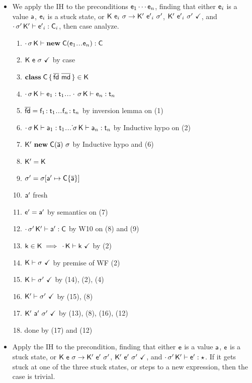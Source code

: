 \documentclass[acmlarge, anonymous, authordraft]{acmart}
\begin{document}
\begin{itemize}
  \item {}
  
  We apply the IH to the preconditions ${\sf{e}}_{1} \cdots {\sf{e}}_{n}$, finding that either ${\sf{e}}_{i}$ is a value ${\sf{a}}$, ${\sf{e}}_{i}$ is a stuck state, 
  or ${{\sf{K}}}~{{\sf{e}}_i}~{\sigma} \rightarrow {{\ensuremath{{\sf{K'}}}}}~{{{{\sf{e'}}}}_i}~{{{\sigma'}}}$, ${{\sf{K'}}}~{{{\sf{e'}}}}_i~{{\sigma'}}~\checkmark$, and $\cdot\,{{\sigma'}}\,{{\sf{K'}}}\vdash {{\ensuremath{{\sf{e'}}}}}_i : {\sf{C}}_i$, then case analyze.
    
  \begin{enumerate}
   \item $\EnvType\cdot\s\K{\New\C{\e_1\dots\e_n}}\C$ 
   \item ${\sf{K}}~{\sf{e}}~\sigma~\checkmark$  by case  
   \item ${\sf{\bf class}}\;{\sf{C}}\,\{\,\overline{{\sf{fd}}}~\overline{{\sf{md}}}\,\} \in {\sf{K}}$  
   \item $\EnvType \cdot\s\K{\e_1}{\t_1}\dots \EnvType \cdot\s\K{\e_n}{\t_n}$
   \item $\b\fd=\Fdef{\f_1}{\t_1}\dots\Fdef{\f_n}{\t_n}$ by inversion lemma on (1)
   \item $\EnvType \cdot\s\K{\a_1}{\t_1}\dots \EnvType \dot\s\K{\a_n}{\t_n}$ by Inductive hypo on (2)
   \item ${{\sf{K'}}}~{{\sf{\bf new}}\;{\sf{C}}(\overline{{\sf{a}}})~\sigma}$ by Inductive hypo and (6)
   \item ${{\sf{K'}}}={\sf{K}}$
   \item ${{\sigma'}}= \sigma[{\sf{a}}' \mapsto  {\sf{C}}\{\overline{{\sf{a}}}\}] $
   \item ${\sf{a}}'$ fresh
   \item ${{{\sf{e'}}}}={\sf{a}}'$ by semantics on (7)
   \item $\cdot\,{{\sigma'}}\,{{\sf{K'}}}\vdash {\sf{a}}' : {\sf{C}}$ by W10 on (8) and (9)
   \item ${\sf{k}} \in {\sf{K}} \implies \,\cdot\,{\sf{K}}\vdash{\sf{k}} ~\checkmark$ by (2)
   \item ${\sf{K}}\vdash\sigma ~\checkmark$ by premise of WF (2)
   \item ${\sf{K}}\vdash{{\ensuremath{\sigma'}}} ~\checkmark$ by (14), (2), (4)
   \item ${{\sf{K'}}}\vdash{{\ensuremath{\sigma'}}} ~\checkmark$ by (15), (8)
   \item ${{\sf{K'}}}~{\sf{a}}'~{{\sigma'}}~\checkmark$ by (13), (8), (16), (12)
   \item done by (17) and (12)
  \end{enumerate}

  \item {}
  
      Apply the IH to the precondition, finding that either ${\sf{e}}$ is a value ${\sf{a}}$, ${\sf{e}}$ is a stuck state, or ${{\sf{K}}}~{{\sf{e}}}~{\sigma} \rightarrow {{\ensuremath{{\sf{K'}}}}}~{{{{\sf{e'}}}}}~{{{\sigma'}}}$, ${{\sf{K'}}}~{{{\sf{e'}}}}~{{\sigma'}}~\checkmark$, and $\cdot\,{{\sigma'}}\,{{\sf{K'}}}\vdash {{\ensuremath{{\sf{e'}}}}} : \star$. If it gets stuck at one of the three stuck states, or steps to a new expression, then the case is trivial.


\end{itemize}
\end{document}
